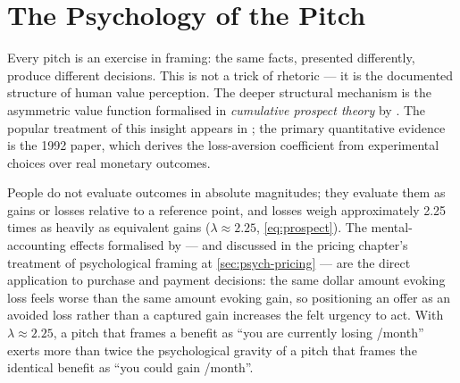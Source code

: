 \section{The Psychology of the Pitch}\label{sec:pitch-psychology}

Every pitch is an exercise in framing: the same facts, presented differently, produce
different decisions. This is not a trick of rhetoric --- it is the documented structure of
human value perception. The deeper structural mechanism is the asymmetric value function
formalised in \emph{cumulative prospect theory} by \textcite{tversky1992cumulative}. The
popular treatment of this insight appears in \textcite{kahneman2011}; the primary
quantitative evidence is the 1992 paper, which derives the loss-aversion coefficient from
experimental choices over real monetary outcomes.

People do not evaluate outcomes in absolute magnitudes; they evaluate them as gains or
losses relative to a reference point, and losses weigh approximately \num{2.25} times as
heavily as equivalent gains ($\lambda \approx 2.25$, \cref{eq:prospect}).
The mental-accounting effects formalised by \textcite{thaler1985mental} --- and discussed
in the pricing chapter's treatment of psychological framing at \cref{sec:psych-pricing}
--- are the direct application to purchase and payment decisions: the same dollar amount
evoking loss feels worse than the same amount evoking gain, so positioning an offer as an
avoided loss rather than a captured gain increases the felt urgency to act. With
$\lambda \approx 2.25$, a pitch that frames a benefit as ``you are currently losing
/month'' exerts more than twice the psychological gravity of a pitch that
frames the identical benefit as ``you could gain /month''.

